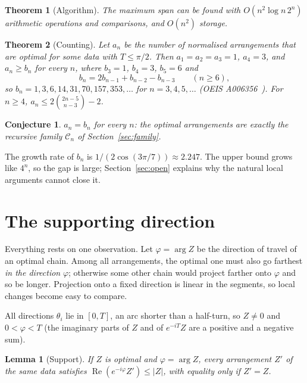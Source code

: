 \documentclass[11pt]{article}
\newtheorem{theorem}{Theorem}
\newtheorem{lemma}{Lemma}[section]
\newtheorem{conjecture}{Conjecture}
\theoremstyle{remark}
\newcommand{\cC}{\mathcal C}
\begin{document}
\begin{theorem}[Algorithm]\label{thm:algorithm}
The maximum span can be found with $O(n^2\log n\,2^n)$ arithmetic operations and comparisons, and $O(n^2)$ storage.
\end{theorem}

\begin{theorem}[Counting]\label{thm:counting}
Let $a_n$ be the number of normalised arrangements that are optimal for some data with $T\le\pi/2$. Then $a_1=a_2=a_3=1$, $a_4=3$, and $a_n\ge b_n$ for every $n$, where $b_3=1$, $b_4=3$, $b_5=6$ and
\[
b_n=2b_{n-1}+b_{n-2}-b_{n-3}\qquad(n\ge6),
\]
so $b_n=1,3,6,14,31,70,157,353,\dots$ for $n=3,4,5,\dots$ (OEIS A006356~\cite{oeis}). For $n\ge4$, $a_n\le 2\binom{2n-5}{n-3}-2$.
\end{theorem}

\begin{conjecture}\label{conj}
$a_n=b_n$ for every $n$: the optimal arrangements are exactly the recursive family $\cC_n$ of Section~\ref{sec:family}.
\end{conjecture}

The growth rate of $b_n$ is $1/(2\cos(3\pi/7))\approx2.247$. The upper bound grows like $4^n$, so the gap is large; Section~\ref{sec:open} explains why the natural local arguments cannot close it.

\section{The supporting direction}\label{sec:support}

Everything rests on one observation. Let $\varphi=\arg Z$ be the direction of travel of an optimal chain. Among all arrangements, the optimal one must also go farthest \emph{in the direction} $\varphi$; otherwise some other chain would project farther onto $\varphi$ and so be longer. Projection onto a fixed direction is linear in the segments, so local changes become easy to compare.

All directions $\theta_i$ lie in $[0,T]$, an arc shorter than a half-turn, so $Z\neq0$ and $0<\varphi<T$ (the imaginary parts of $Z$ and of $e^{-iT}Z$ are a positive and a negative sum).

\begin{lemma}[Support]\label{lem:support}
If $Z$ is optimal and $\varphi=\arg Z$, every arrangement $Z'$ of the same data satisfies $\operatorname{Re}(e^{-i\varphi}Z')\le|Z|$, with equality only if $Z'=Z$.
\end{lemma}
\end{document}
